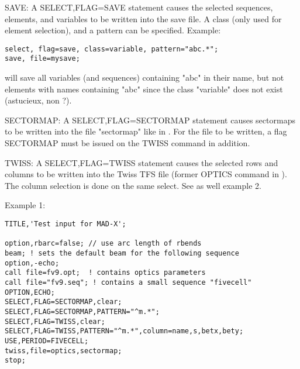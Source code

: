 \label{save_select}
SAVE: A SELECT,FLAG=SAVE statement causes the
selected sequences, elements, and variables to be written into the save
file. A class (only used for element selection), and a pattern can be
specified. Example:  
\begin{verbatim}
select, flag=save, class=variable, pattern="abc.*";
save, file=mysave;
\end{verbatim} 
will save all variables (and sequences) containing "abc" in their name,
but not elements with names containing "abc" since the class "variable"
does not exist (astucieux, non ?).  

SECTORMAP: A SELECT,FLAG=SECTORMAP statement causes sectormaps to be
written into the file "sectormap" like in \madeight. For the file to be
written, a flag SECTORMAP must be issued on the TWISS command in
addition.  

TWISS: A SELECT,FLAG=TWISS statement causes the selected rows and
columns to be written into the Twiss TFS file (former OPTICS command in
\madeight). The column selection is done on the same select. See as well
example 2.  

Example 1:  
\begin{verbatim}
TITLE,'Test input for MAD-X';

option,rbarc=false; // use arc length of rbends
beam; ! sets the default beam for the following sequence
option,-echo;
call file=fv9.opt;  ! contains optics parameters
call file="fv9.seq"; ! contains a small sequence "fivecell"
OPTION,ECHO;
SELECT,FLAG=SECTORMAP,clear;
SELECT,FLAG=SECTORMAP,PATTERN="^m.*";
SELECT,FLAG=TWISS,clear;
SELECT,FLAG=TWISS,PATTERN="^m.*",column=name,s,betx,bety;
USE,PERIOD=FIVECELL;
twiss,file=optics,sectormap;
stop;
\end{verbatim} 

